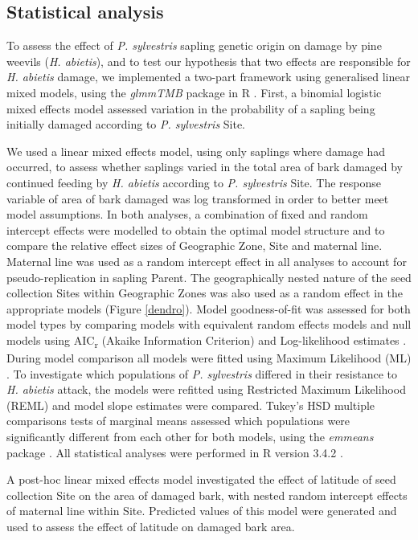 \documentclass[a4paper, 11pt]{article}
\begin{document}
\subsection*{Statistical analysis}

To assess the effect of \textit{P. sylvestris} sapling genetic origin on damage by pine weevils (\textit{H. abietis}), and to test our hypothesis that two effects are responsible for \textit{H. abietis} damage, we implemented a two-part framework using generalised linear mixed models, using the \textit{glmmTMB} package in R \citep{glmmTMB}. First, a binomial logistic mixed effects model assessed variation in the probability of a sapling being initially damaged  according to \textit{P. sylvestris} Site.

We used a linear mixed effects model, using only saplings where damage had occurred, to assess whether saplings varied in the total area of bark damaged by continued feeding by \textit{H. abietis} according to \textit{P. sylvestris} Site. The response variable of area of bark damaged was log transformed in order to better meet model assumptions. In both analyses, a combination of fixed and random intercept effects were modelled to obtain the optimal model structure and to compare the relative effect sizes of Geographic Zone, Site and maternal line. Maternal line was used as a random intercept effect in all analyses to account for pseudo-replication in sapling Parent. The geographically nested nature of the seed collection Sites within Geographic Zones was also used as a random effect in the appropriate models (Figure \ref{dendro}). Model goodness-of-fit was assessed for both model types by comparing models with equivalent random effects models and null models using AIC\textsubscript{r} (Akaike Information Criterion) and Log-likelihood estimates \citep{Bolker2008}. During model comparison all models were fitted using Maximum Likelihood (ML) \citep{Bolker2008}. To investigate which populations of \textit{P. sylvestris} differed in their resistance to \textit{H. abietis} attack, the models were refitted using Restricted Maximum Likelihood (REML) and model slope estimates were compared. Tukey's HSD multiple comparisons tests of marginal means assessed which populations were significantly different from each other for both models, using the \textit{emmeans} package \citep{Russell2019}. All statistical analyses were performed in R version 3.4.2 \citep{RCoreTeam2019}. 

A post-hoc linear mixed effects model investigated the effect of latitude of seed collection Site on the area of damaged bark, with nested random intercept effects of maternal line within Site. Predicted values of this model were generated and used to assess the effect of latitude on damaged bark area. 
\end{document}
